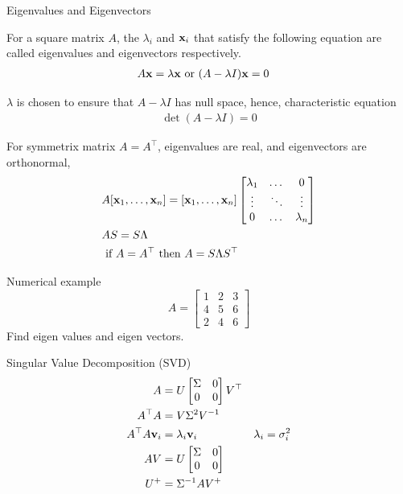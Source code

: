 \documentclass[times,t]{beamer}
\begin{document}
\begin{frame}{Eigenvalues  and Eigenvectors}

For a  square  matrix $A$, the $\lambda_i$ and  $\mathbf{x}_i$ that satisfy  the
following equation are called eigenvalues and  eigenvectors  respectively.
\begin{align}
  A  \mathbf{x} &= \lambda \mathbf{x} \text{ or } (A  - \lambda I)\mathbf{x}  = 0
\end{align}

$\lambda$ is   chosen to ensure  that   $A  -  \lambda I$  has null space,
hence, characteristic   equation
\begin{align}
  \det(A  - \lambda I) = 0 
 \end{align}

 For  symmetrix matrix $A =  A^\top$, eigenvalues  are  real, and eigenvectors
 are orthonormal,
 \begin{align}
   &A[\mathbf{x}_1, \dots,   \mathbf{x}_n]  = [\mathbf{x}_1, \dots,   \mathbf{x}_n]\begin{bmatrix}\lambda_1 &   \dots   &  0 \\
     \vdots   &   \ddots &  \vdots \\
   0 &   \dots  &  \lambda_n \end{bmatrix}
                  \\
   &A  S = S  \Lambda
   \\
   &\text{  if   }  A =  A^\top \text{ then   }  A   = S \Lambda S^\top
   \end{align}


\end{frame}


\begin{frame}{Numerical example}
  \[
  A   =  \begin{bmatrix}
    1 &   2  &  3  \\
    4 & 5 &   6 \\
    2 & 4 &   6
  \end{bmatrix}
  \]
Find eigen values and eigen vectors.
\end{frame}


\begin{frame}{Singular Value  Decomposition (SVD)}
  \begin{align}
    A  &=   U  \begin{bmatrix}\Sigma   &  0  \\   0  &  0 \end{bmatrix} V^\top \\
    A^\top A &= V \Sigma^2  V^{-1} \\
    A^\top A \mathbf{v}_i  &= \lambda_i \mathbf{v}_i & \lambda_i = \sigma_i^2\\
    A V   &= U \begin{bmatrix}\Sigma   &  0  \\   0  &  0 \end{bmatrix}\\
    U^+   &=  \Sigma^{-1}AV^+
    \end{align}
\end{frame}
\end{document}
